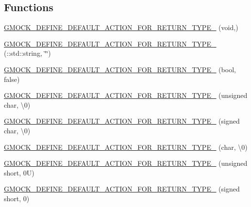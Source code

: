 \subsection*{Functions}
\begin{DoxyCompactItemize}
\item 
\mbox{\hyperlink{namespacetesting_1_1internal_a8fe6f7c11d6d3dd6e42b75c9a5b43861}{G\+M\+O\+C\+K\+\_\+\+D\+E\+F\+I\+N\+E\+\_\+\+D\+E\+F\+A\+U\+L\+T\+\_\+\+A\+C\+T\+I\+O\+N\+\_\+\+F\+O\+R\+\_\+\+R\+E\+T\+U\+R\+N\+\_\+\+T\+Y\+P\+E\+\_\+}} (void,)
\item 
\mbox{\hyperlink{namespacetesting_1_1internal_a0a961f38f341d40237252babcb3767b7}{G\+M\+O\+C\+K\+\_\+\+D\+E\+F\+I\+N\+E\+\_\+\+D\+E\+F\+A\+U\+L\+T\+\_\+\+A\+C\+T\+I\+O\+N\+\_\+\+F\+O\+R\+\_\+\+R\+E\+T\+U\+R\+N\+\_\+\+T\+Y\+P\+E\+\_\+}} (\+::std\+::string, \char`\"{}\char`\"{})
\item 
\mbox{\hyperlink{namespacetesting_1_1internal_aa6670915f42119e4ba20d8cb74fc1eea}{G\+M\+O\+C\+K\+\_\+\+D\+E\+F\+I\+N\+E\+\_\+\+D\+E\+F\+A\+U\+L\+T\+\_\+\+A\+C\+T\+I\+O\+N\+\_\+\+F\+O\+R\+\_\+\+R\+E\+T\+U\+R\+N\+\_\+\+T\+Y\+P\+E\+\_\+}} (bool, false)
\item 
\mbox{\hyperlink{namespacetesting_1_1internal_ab203e2c4c54f2ca86439344347a3e43f}{G\+M\+O\+C\+K\+\_\+\+D\+E\+F\+I\+N\+E\+\_\+\+D\+E\+F\+A\+U\+L\+T\+\_\+\+A\+C\+T\+I\+O\+N\+\_\+\+F\+O\+R\+\_\+\+R\+E\+T\+U\+R\+N\+\_\+\+T\+Y\+P\+E\+\_\+}} (unsigned char, \textquotesingle{}\textbackslash{}0\textquotesingle{})
\item 
\mbox{\hyperlink{namespacetesting_1_1internal_aaedb3b1b5307625bc84dc660742da3c6}{G\+M\+O\+C\+K\+\_\+\+D\+E\+F\+I\+N\+E\+\_\+\+D\+E\+F\+A\+U\+L\+T\+\_\+\+A\+C\+T\+I\+O\+N\+\_\+\+F\+O\+R\+\_\+\+R\+E\+T\+U\+R\+N\+\_\+\+T\+Y\+P\+E\+\_\+}} (signed char, \textquotesingle{}\textbackslash{}0\textquotesingle{})
\item 
\mbox{\hyperlink{namespacetesting_1_1internal_aeaaa7101572f283fe70a85ad5e6c65dc}{G\+M\+O\+C\+K\+\_\+\+D\+E\+F\+I\+N\+E\+\_\+\+D\+E\+F\+A\+U\+L\+T\+\_\+\+A\+C\+T\+I\+O\+N\+\_\+\+F\+O\+R\+\_\+\+R\+E\+T\+U\+R\+N\+\_\+\+T\+Y\+P\+E\+\_\+}} (char, \textquotesingle{}\textbackslash{}0\textquotesingle{})
\item 
\mbox{\hyperlink{namespacetesting_1_1internal_ab2965a6078670393812e67f8e5fcb072}{G\+M\+O\+C\+K\+\_\+\+D\+E\+F\+I\+N\+E\+\_\+\+D\+E\+F\+A\+U\+L\+T\+\_\+\+A\+C\+T\+I\+O\+N\+\_\+\+F\+O\+R\+\_\+\+R\+E\+T\+U\+R\+N\+\_\+\+T\+Y\+P\+E\+\_\+}} (unsigned short, 0\+U)
\item 
\mbox{\hyperlink{namespacetesting_1_1internal_ae6ea5db83b290e2412f321c3b1eb8c47}{G\+M\+O\+C\+K\+\_\+\+D\+E\+F\+I\+N\+E\+\_\+\+D\+E\+F\+A\+U\+L\+T\+\_\+\+A\+C\+T\+I\+O\+N\+\_\+\+F\+O\+R\+\_\+\+R\+E\+T\+U\+R\+N\+\_\+\+T\+Y\+P\+E\+\_\+}} (signed short, 0)

\end{DoxyCompactItemize}

